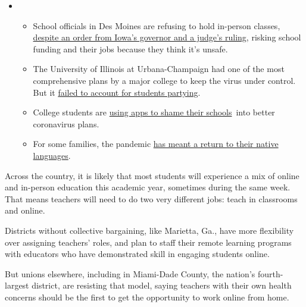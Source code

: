 \begin{itemize}
\item
  \begin{itemize}
  \tightlist
  \item
    School officials in Des Moines are refusing to hold in-person
    classes,
    \href{https://www.nytimes3xbfgragh.onion/2020/09/10/us/des-moines-school-opening-coronavirus.html?action=click\&pgtype=Article\&state=default\&region=MAIN_CONTENT_3\&context=storylines_keepup}{despite
    an order from Iowa's governor and a judge's ruling}, risking school
    funding and their jobs because they think it's unsafe.
  \item
    The University of Illinois at Urbana-Champaign had one of the most
    comprehensive plans by a major college to keep the virus under
    control. But it
    \href{https://www.nytimes3xbfgragh.onion/2020/09/10/health/university-illinois-covid.html?action=click\&pgtype=Article\&state=default\&region=MAIN_CONTENT_3\&context=storylines_keepup}{failed
    to account for students partying}.
  \item
    College students are
    \href{https://www.nytimes3xbfgragh.onion/2020/09/10/technology/coronavirus-quarantines-college.html?action=click\&pgtype=Article\&state=default\&region=MAIN_CONTENT_3\&context=storylines_keepup}{using
    apps to shame their schools}~into better coronavirus plans.
  \item
    For some families, the pandemic
    \href{https://www.nytimes3xbfgragh.onion/2020/09/10/parenting/family-second-language-coronavirus.html?action=click\&pgtype=Article\&state=default\&region=MAIN_CONTENT_3\&context=storylines_keepup}{has
    meant a return to their native languages}.
  \end{itemize}
\end{itemize}

Across the country, it is likely that most students will experience a
mix of online and in-person education this academic year, sometimes
during the same week. That means teachers will need to do two very
different jobs: teach in classrooms and online.

Districts without collective bargaining, like Marietta, Ga., have more
flexibility over assigning teachers' roles, and plan to staff their
remote learning programs with educators who have demonstrated skill in
engaging students online.

But unions elsewhere, including in Miami-Dade County, the nation's
fourth-largest district, are resisting that model, saying teachers with
their own health concerns should be the first to get the opportunity to
work online from home.

